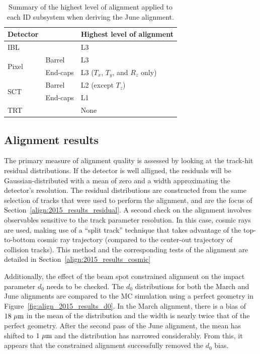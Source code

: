 \begin{table}[htbp]
  \centering
  \begin{tabular}{l l | l}
    Detector & & Highest level of alignment\\
    \hline\hline
    IBL && L3 \\
    \hline
    \multirow{2}{*}{Pixel} & Barrel & L3 \\
                           & End-caps & L3 ($T_x$, $T_y$, and $R_z$ only) \\
    \hline
    \multirow{2}{*}{SCT} & Barrel & L2 (except $T_z$) \\
                           & End-caps & L1 \\
    \hline
    TRT && None\\
    \hline
  \end{tabular} 
  \caption{Summary of the highest level of alignment applied to each ID subsystem when deriving the June alignment.}
  \label{tab:align_june_levels}
\end{table}

\subsection{Alignment results}
The primary measure of alignment quality is assessed by looking at the track-hit residual distributions.
If the detector is well alligned, the residuals will be Gaussian-distributed with a mean of zero and a width approximating the detector's resolution.
The residual distributions are constructed from the same selection of tracks that were used to perform the alignment, and are the focus of Section~\ref{align:2015_results_residual}.
A second check on the alignment involves observables sensitive to the track parameter resolution.
In this case, cosmic rays are used, making use of a ``split track'' technique that takes advantage of the top-to-bottom cosmic ray trajectory (compared to the center-out trajectory of collision tracks).
This method and the corresponding tests of the alignment are detailed in Section~\ref{align:2015_results_cosmic}

Additionally, the effect of the beam spot constrained alignment on the impact parameter $d_0$ needs to be checked.
The $d_0$ distributions for both the March and June alignments are compared to the MC simulation using a perfect geometry in Figure~\ref{fig:align_2015_results_d0}.
In the March alignment, there is a bias of $18~\mu\textrm{m}$ in the mean of the distribution and the width is nearly twice that of the perfect geometry.
After the second pass of the June alignment, the mean has shifted to $1~\mu\textrm{m}$ and the distribution has narrowed considerably.
From this, it appears that the constrained alignment successfully removed the $d_0$ bias.

